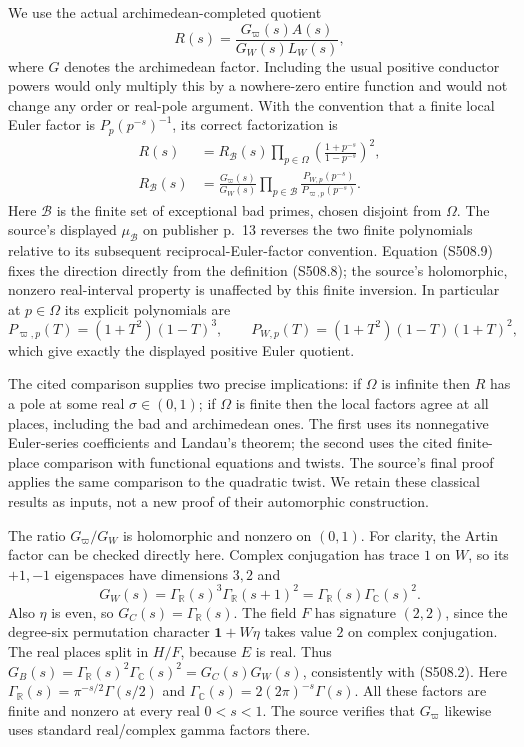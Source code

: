 We use the actual archimedean-completed quotient
\[
 R(s)=\frac{G_{\varpi}(s)A(s)}{G_W(s)L_W(s)},
 \tag{S508.8}
\]
where $G$ denotes the archimedean factor.  Including the usual
positive conductor powers would only multiply this by a
nowhere-zero entire function and would not change any order
or real-pole argument.  With the convention that a finite local
Euler factor is $P_p(p^{-s})^{-1}$, its correct factorization is
\[
 \begin{aligned}
 R(s)&=R_{\mathcal B}(s)
      \prod_{p\in\Omega}
             \left(\frac{1+p^{-s}}{1-p^{-s}}\right)^2,\\
 R_{\mathcal B}(s)&=
       \frac{G_{\varpi}(s)}{G_W(s)}
       \prod_{p\in\mathcal B}
             \frac{P_{W,p}(p^{-s})}{P_{\varpi,p}(p^{-s})}.
 \end{aligned}
 \tag{S508.9}
\]
Here $\mathcal B$ is the finite set of exceptional bad primes,
chosen disjoint from $\Omega$.  The source's displayed
$\mu_{\mathcal B}$ on publisher p.~13 reverses the two finite
polynomials relative to its subsequent reciprocal-Euler-factor
convention.  Equation (S508.9) fixes the direction directly from
the definition (S508.8); the source's holomorphic, nonzero
real-interval property is unaffected by this finite inversion.
In particular at $p\in\Omega$ its explicit polynomials are
\[
 P_{\varpi,p}(T)=(1+T^2)(1-T)^3,\qquad
 P_{W,p}(T)=(1+T^2)(1-T)(1+T)^2,
\]
which give exactly the displayed positive Euler quotient.

The cited comparison supplies two precise implications:
if $\Omega$ is infinite then $R$ has a pole at some real
$\sigma\in(0,1)$; if $\Omega$ is finite then the local factors
agree at all places, including the bad and archimedean ones.
The first uses its nonnegative Euler-series coefficients and
Landau's theorem; the second uses the cited finite-place
comparison with functional equations and twists.  The source's
final proof applies the same comparison to the quadratic twist.
We retain these classical results as inputs, not a new proof
of their automorphic construction.

The ratio $G_{\varpi}/G_W$ is holomorphic and nonzero on $(0,1)$.
For clarity, the Artin factor can be checked directly here.
Complex conjugation has trace $1$ on $W$, so its $+1,-1$
eigenspaces have dimensions $3,2$ and
\[
 G_W(s)=\Gamma_{\mathbb R}(s)^3\Gamma_{\mathbb R}(s+1)^2
       =\Gamma_{\mathbb R}(s)\Gamma_{\mathbb C}(s)^2.
 \tag{S508.10}
\]
Also $\eta$ is even, so $G_C(s)=\Gamma_{\mathbb R}(s)$.
The field $F$ has signature $(2,2)$, since the degree-six
permutation character $\mathbf1+W\eta$ takes value $2$ on
complex conjugation.  The real places split in $H/F$, because
$E$ is real.  Thus
$G_B(s)=\Gamma_{\mathbb R}(s)^2\Gamma_{\mathbb C}(s)^2
=G_C(s)G_W(s)$, consistently with (S508.2).
Here $\Gamma_{\mathbb R}(s)=\pi^{-s/2}\Gamma(s/2)$ and
$\Gamma_{\mathbb C}(s)=2(2\pi)^{-s}\Gamma(s)$.
All these factors are finite and nonzero at every real
$0<s<1$.  The source verifies that $G_{\varpi}$ likewise
uses standard real/complex gamma factors there.

